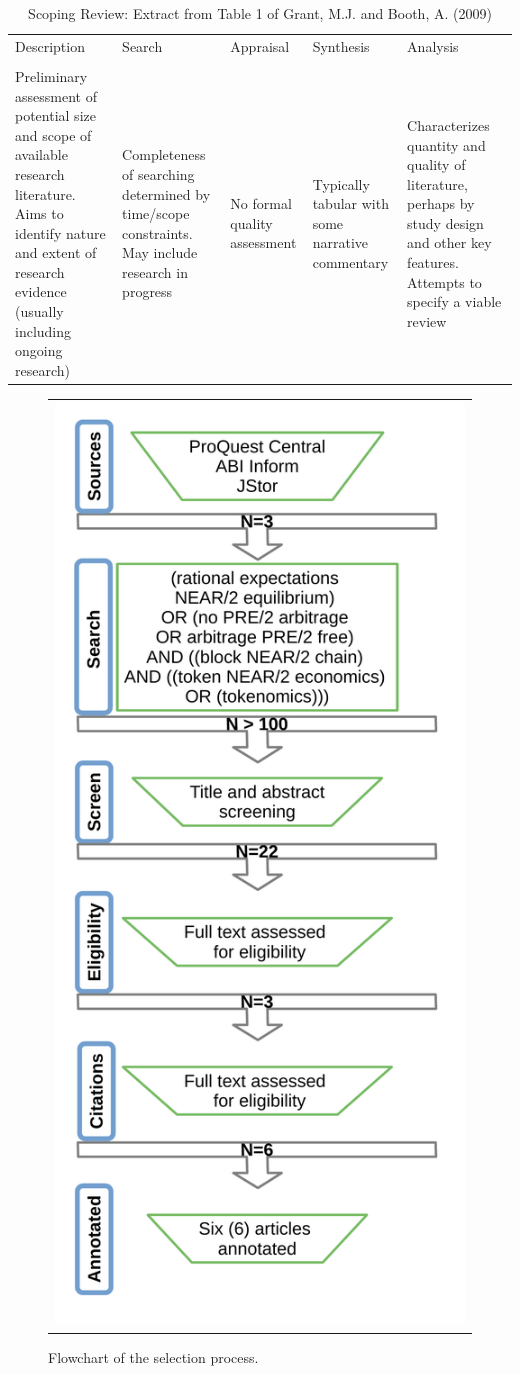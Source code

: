 \documentclass[11pt]{article}
\begin{document}
\begin{table}[!ht]
\caption{Scoping Review: Extract from Table 1 of Grant, M.J. and Booth, A. (2009)} %
\centering %
\begin{tabular}{p{}p{}p{}p{}p{}} %
\hline\hline %
Description & Search & Appraisal & Synthesis & Analysis \\ [0.5ex]
\\ [0.5ex]
\hline %

Preliminary assessment of potential size and scope of available research literature. Aims to identify nature and extent of research evidence (usually including ongoing research)	
& Completeness of searching determined by time/scope constraints. May include research in progress 
& No formal quality assessment 
& Typically tabular with some narrative commentary
& Characterizes quantity and quality of literature, perhaps by study design and other key features. Attempts to specify a viable review\\[1.5ex]
\hline %

\end{tabular}
\label{tbl:sr}
\end{table}

\begin{figure}[!ht]
   \centering
   \begin{tabular}{c}
       \includegraphics[page=1,width=.5\textwidth]{flowchart} 
   \end{tabular}
 \caption{Flowchart of the selection process.}
 \label{fig:flowchart}
\end{figure}
\end{document}
